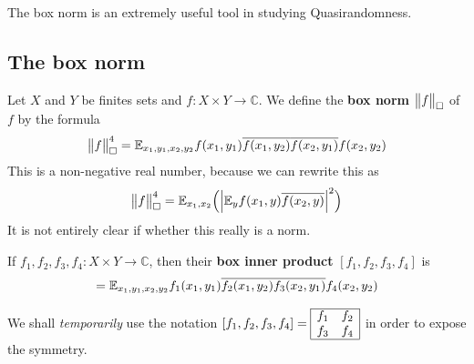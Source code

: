 \documentclass[12pt,a4paper]{report}
\begin{document}
The box norm is an extremely useful tool in studying Quasirandomness.

\subsection*{The box norm}
\quad Let $X$ and $Y$ be finites sets and $f:X\times Y \rightarrow \mathbb{C}$. We define the \textbf{box norm} $\bigl\lVert f\bigr\rVert_{\square}$ of $f$ by the formula
\begin{align*}
\bigl\lVert f\bigr\rVert_{\tiny{\square}}^4 = \mathbb{E}_{x_1,y_1,x_2,y_2} f(x_1,y_1) \overline{f(x_1,y_2)}\overline{f(x_2,y_1)} f(x_2,y_2)
\end{align*}
This is a non-negative real number, because we can rewrite this as
\begin{align*}
\bigl\lVert f\bigr\rVert_{\tiny{\square}}^4 = \mathbb{E}_{x_1,x_2} \Big( \Big| \mathbb{E}_y f(x_1,y) \overline{f(x_2,y)} \Big|^2 \Big)
\end{align*}
It is not entirely clear if whether this really is a norm.
\s

\quad If $f_1,f_2,f_3,f_4 :X\times Y \rightarrow \mathbb{C}$, then their \textbf{box inner product} $[f_1,f_2,f_3,f_4]$ is
\begin{align*}
[f_1,f_2,f_3,f_4] = \avg_{x_1,y_1,x_2,y_2} f_1(x_1,y_1) \bar{f_2(x_1,y_2)} \bar{f_3(x_2,y_1)} f_4(x_2,y_2)
\end{align*}
\s

We shall \emph{temporarily} use the notation $[f_1,f_2,f_3,f_4]=\boxinn{f_1}{f_2}{f_3}{f_4}$ in order to expose the symmetry.
\s
\end{document}
